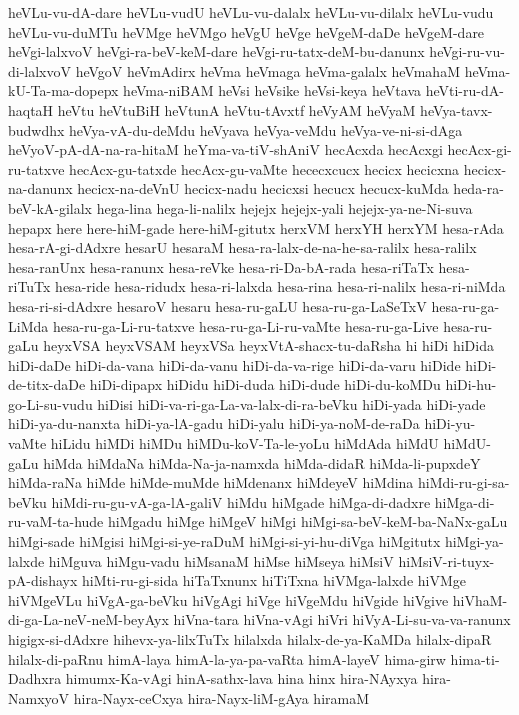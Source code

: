 {heVLu-vu-dA-dare
heVLu-vudU
heVLu-vu-dalalx
heVLu-vu-dilalx
heVLu-vudu
heVLu-vu-duMTu
heVMge
heVMgo
heVgU
heVge
heVgeM-daDe
heVgeM-dare
heVgi-lalxvoV
heVgi-ra-beV-keM-dare
heVgi-ru-tatx-deM-bu-danunx
heVgi-ru-vu-di-lalxvoV
heVgoV
heVmAdirx
heVma
heVmaga
heVma-galalx
heVmahaM
heVma-kU-Ta-ma-dopepx
heVma-niBAM
heVsi
heVsike
heVsi-keya
heVtava
heVti-ru-dA-haqtaH
heVtu
heVtuBiH
heVtunA
heVtu-tAvxtf
heVyAM
heVyaM
heVya-tavx-budwdhx
heVya-vA-du-deMdu
heVyava
heVya-veMdu
heVya-ve-ni-si-dAga
heVyoV-pA-dA-na-ra-hitaM
heYma-va-tiV-shAniV
hecAcxda
hecAcxgi
hecAcx-gi-ru-tatxve
hecAcx-gu-tatxde
hecAcx-gu-vaMte
hececxcucx
hecicx
hecicxna
hecicx-na-danunx
hecicx-na-deVnU
hecicx-nadu
hecicxsi
hecucx
hecucx-kuMda
heda-ra-beV-kA-gilalx
hega-lina
hega-li-nalilx
hejejx
hejejx-yali
hejejx-ya-ne-Ni-suva
hepapx
here
here-hiM-gade
here-hiM-gitutx
herxVM
herxYH
herxYM
hesa-rAda
hesa-rA-gi-dAdxre
hesarU
hesaraM
hesa-ra-lalx-de-na-he-sa-ralilx
hesa-ralilx
hesa-ranUnx
hesa-ranunx
hesa-reVke
hesa-ri-Da-bA-rada
hesa-riTaTx
hesa-riTuTx
hesa-ride
hesa-ridudx
hesa-ri-lalxda
hesa-rina
hesa-ri-nalilx
hesa-ri-niMda
hesa-ri-si-dAdxre
hesaroV
hesaru
hesa-ru-gaLU
hesa-ru-ga-LaSeTxV
hesa-ru-ga-LiMda
hesa-ru-ga-Li-ru-tatxve
hesa-ru-ga-Li-ru-vaMte
hesa-ru-ga-Live
hesa-ru-gaLu
heyxVSA
heyxVSAM
heyxVSa
heyxVtA-shacx-tu-daRsha
hi
hiDi
hiDida
hiDi-daDe
hiDi-da-vana
hiDi-da-vanu
hiDi-da-va-rige
hiDi-da-varu
hiDide
hiDi-de-titx-daDe
hiDi-dipapx
hiDidu
hiDi-duda
hiDi-dude
hiDi-du-koMDu
hiDi-hu-go-Li-su-vudu
hiDisi
hiDi-va-ri-ga-La-va-lalx-di-ra-beVku
hiDi-yada
hiDi-yade
hiDi-ya-du-nanxta
hiDi-ya-lA-gadu
hiDi-yalu
hiDi-ya-noM-de-raDa
hiDi-yu-vaMte
hiLidu
hiMDi
hiMDu
hiMDu-koV-Ta-le-yoLu
hiMdAda
hiMdU
hiMdU-gaLu
hiMda
hiMdaNa
hiMda-Na-ja-namxda
hiMda-didaR
hiMda-li-pupxdeY
hiMda-raNa
hiMde
hiMde-muMde
hiMdenanx
hiMdeyeV
hiMdina
hiMdi-ru-gi-sa-beVku
hiMdi-ru-gu-vA-ga-lA-galiV
hiMdu
hiMgade
hiMga-di-dadxre
hiMga-di-ru-vaM-ta-hude
hiMgadu
hiMge
hiMgeV
hiMgi
hiMgi-sa-beV-keM-ba-NaNx-gaLu
hiMgi-sade
hiMgisi
hiMgi-si-ye-raDuM
hiMgi-si-yi-hu-diVga
hiMgitutx
hiMgi-ya-lalxde
hiMguva
hiMgu-vadu
hiMsanaM
hiMse
hiMseya
hiMsiV
hiMsiV-ri-tuyx-pA-dishayx
hiMti-ru-gi-sida
hiTaTxnunx
hiTiTxna
hiVMga-lalxde
hiVMge
hiVMgeVLu
hiVgA-ga-beVku
hiVgAgi
hiVge
hiVgeMdu
hiVgide
hiVgive
hiVhaM-di-ga-La-neV-neM-beyAyx
hiVna-tara
hiVna-vAgi
hiVri
hiVyA-Li-su-va-va-ranunx
higigx-si-dAdxre
hihevx-ya-lilxTuTx
hilalxda
hilalx-de-ya-KaMDa
hilalx-dipaR
hilalx-di-paRnu
himA-laya
himA-la-ya-pa-vaRta
himA-layeV
hima-girw
hima-ti-Dadhxra
himumx-Ka-vAgi
hinA-sathx-lava
hina
hinx
hira-NAyxya
hira-NamxyoV
hira-Nayx-ceCxya
hira-Nayx-liM-gAya
hiramaM
}
